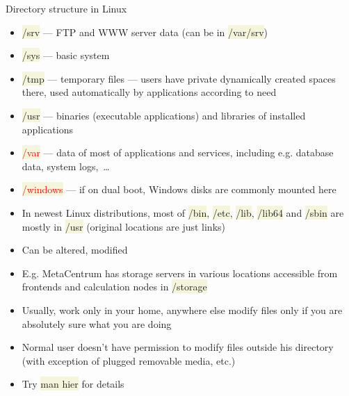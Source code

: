 \documentclass[compress, ucs, xelatex, 11pt, xcolor=svgnames, aspectratio=169,
	hyperref={
		bookmarks=true,
		unicode=true,
		colorlinks=true,
		pdftitle={Linux, command line and MetaCentrum},
		plainpages=false,
		pdfauthor={Vojtech Zeisek},
		pdfsubject={Course about use of Linux command line, writing shell scripts and using MetaCentrum of CESNET},
		pdfcreator={XeLaTeX},
		pdfkeywords={Linux, GNU, BASH, shell, command line, MetaCentrum},
		linkcolor=DarkRed, %
		anchorcolor=DarkBlue, %
		citecolor=Indigo, %
		filecolor=NavyBlue, %
		menucolor=DarkMagenta, %
		urlcolor=DarkBlue, %
		pdftex},
	url={hyphens, lowtilde} %
	]{beamer}
\renewcommand{\texttt}[1]{\colorbox{Beige}{{\ttfamily #1}}}
\renewcommand{\alert}[1]{\textcolor{red}{#1}}
\begin{document}
\begin{frame}[allowframebreaks]{Directory structure in Linux}
\begin{itemize}
		\item \texttt{/srv} --- FTP and WWW server data (can be in \texttt{/var/srv})
		\item \texttt{/sys} --- basic system
		\item \texttt{/tmp} --- temporary files --- users have private dynamically created spaces there, used automatically by applications according to need
		\item \texttt{/usr} --- binaries (executable applications) and libraries of installed applications
		\item \alert{\texttt{/var}} --- data of most of applications and services, including e.g. database data, system logs,~\ldots
		\item \alert{\texttt{/windows}} --- if on dual boot, Windows disks are commonly mounted here
		\item In newest Linux distributions, most of \texttt{/bin}, \texttt{/etc}, \texttt{/lib}, \texttt{/lib64} and \texttt{/sbin} are mostly in \texttt{/usr} (original locations are just links)
		\item Can be altered, modified
		\item E.g. MetaCentrum has storage servers in various locations accessible from frontends and calculation nodes in \texttt{/storage}
		\item Usually, work only in your home, anywhere else modify files only if you are absolutely sure what you are doing
		\item Normal user doesn't have permission to modify files outside his directory (with exception of plugged removable media, etc.)
		\item Try \texttt{man hier} for details
	\end{itemize}
\end{frame}
\end{document}
